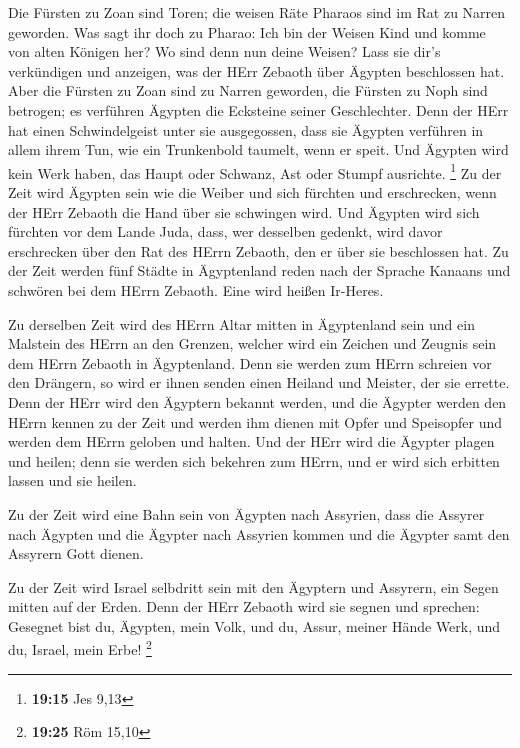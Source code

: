  Die Fürsten zu Zoan sind Toren; die weisen Räte Pharaos
sind im Rat zu Narren geworden. Was sagt ihr doch zu Pharao: Ich bin der
Weisen Kind und komme von alten Königen her?  Wo sind denn
nun deine Weisen? Lass sie dir's verkündigen und anzeigen, was der HErr
Zebaoth über Ägypten beschlossen hat.  Aber die Fürsten zu
Zoan sind zu Narren geworden, die Fürsten zu Noph sind betrogen; es
verführen Ägypten die Ecksteine seiner Geschlechter.  Denn
der HErr hat einen Schwindelgeist unter sie ausgegossen, dass sie
Ägypten verführen in allem ihrem Tun, wie ein Trunkenbold taumelt, wenn
er speit.  Und Ägypten wird kein Werk haben, das Haupt oder
Schwanz, Ast oder Stumpf ausrichte. \footnote{\textbf{19:15} Jes 9,13}
 Zu der Zeit wird Ägypten sein wie die Weiber und sich
fürchten und erschrecken, wenn der HErr Zebaoth die Hand über sie
schwingen wird.  Und Ägypten wird sich fürchten vor dem
Lande Juda, dass, wer desselben gedenkt, wird davor erschrecken über den
Rat des HErrn Zebaoth, den er über sie beschlossen hat.  Zu
der Zeit werden fünf Städte in Ägyptenland reden nach der Sprache
Kanaans und schwören bei dem HErrn Zebaoth. Eine wird heißen Ir-Heres.

 Zu derselben Zeit wird des HErrn Altar mitten in
Ägyptenland sein und ein Malstein des HErrn an den Grenzen,
 welcher wird ein Zeichen und Zeugnis sein dem HErrn
Zebaoth in Ägyptenland. Denn sie werden zum HErrn schreien vor den
Drängern, so wird er ihnen senden einen Heiland und Meister, der sie
errette.  Denn der HErr wird den Ägyptern bekannt werden,
und die Ägypter werden den HErrn kennen zu der Zeit und werden ihm
dienen mit Opfer und Speisopfer und werden dem HErrn geloben und halten.
 Und der HErr wird die Ägypter plagen und heilen; denn sie
werden sich bekehren zum HErrn, und er wird sich erbitten lassen und sie
heilen.

 Zu der Zeit wird eine Bahn sein von Ägypten nach Assyrien,
dass die Assyrer nach Ägypten und die Ägypter nach Assyrien kommen und
die Ägypter samt den Assyrern Gott dienen.

 Zu der Zeit wird Israel selbdritt sein mit den Ägyptern
und Assyrern, ein Segen mitten auf der Erden.  Denn der
HErr Zebaoth wird sie segnen und sprechen: Gesegnet bist du, Ägypten,
mein Volk, und du, Assur, meiner Hände Werk, und du, Israel, mein Erbe!
\footnote{\textbf{19:25} Röm 15,10}

